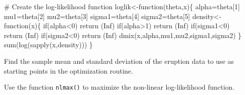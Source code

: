 \documentclass[
  letterpaper,
  DIV=11,
  numbers=noendperiod]{scrreprt}
\newenvironment{Shaded}{\begin{snugshade}}{\end{snugshade}}
\newcommand{\AttributeTok}[1]{\textcolor[rgb]{0.40,0.45,0.13}{#1}}
\newcommand{\CommentTok}[1]{\textcolor[rgb]{0.37,0.37,0.37}{#1}}
\newcommand{\ConstantTok}[1]{\textcolor[rgb]{0.56,0.35,0.01}{#1}}
\newcommand{\ControlFlowTok}[1]{\textcolor[rgb]{0.00,0.23,0.31}{#1}}
\newcommand{\DecValTok}[1]{\textcolor[rgb]{0.68,0.00,0.00}{#1}}
\newcommand{\FloatTok}[1]{\textcolor[rgb]{0.68,0.00,0.00}{#1}}
\newcommand{\FunctionTok}[1]{\textcolor[rgb]{0.28,0.35,0.67}{#1}}
\newcommand{\NormalTok}[1]{\textcolor[rgb]{0.00,0.23,0.31}{#1}}
\newcommand{\OtherTok}[1]{\textcolor[rgb]{0.00,0.23,0.31}{#1}}
\newcommand{\SpecialCharTok}[1]{\textcolor[rgb]{0.37,0.37,0.37}{#1}}
\begin{document}
\begin{Shaded}
\begin{Highlighting}[]
\CommentTok{\# Create the log{-}likelihood function}
\NormalTok{loglik}\OtherTok{\textless{}{-}}\ControlFlowTok{function}\NormalTok{(theta,x)\{}
\NormalTok{  alpha}\OtherTok{=}\NormalTok{theta[}\DecValTok{1}\NormalTok{]}
\NormalTok{  mu1}\OtherTok{=}\NormalTok{theta[}\DecValTok{2}\NormalTok{]}
\NormalTok{  mu2}\OtherTok{=}\NormalTok{theta[}\DecValTok{3}\NormalTok{]}
\NormalTok{  sigma1}\OtherTok{=}\NormalTok{theta[}\DecValTok{4}\NormalTok{]}
\NormalTok{  sigma2}\OtherTok{=}\NormalTok{theta[}\DecValTok{5}\NormalTok{]}
\NormalTok{  density}\OtherTok{\textless{}{-}}\ControlFlowTok{function}\NormalTok{(x)\{}
    \ControlFlowTok{if}\NormalTok{(alpha}\SpecialCharTok{\textless{}}\DecValTok{0}\NormalTok{) }\FunctionTok{return}\NormalTok{ (}\ConstantTok{Inf}\NormalTok{)}
    \ControlFlowTok{if}\NormalTok{(alpha}\SpecialCharTok{\textgreater{}}\DecValTok{1}\NormalTok{) }\FunctionTok{return}\NormalTok{ (}\ConstantTok{Inf}\NormalTok{)}
    \ControlFlowTok{if}\NormalTok{(sigma1}\SpecialCharTok{\textless{}}\DecValTok{0}\NormalTok{) }\FunctionTok{return}\NormalTok{ (}\ConstantTok{Inf}\NormalTok{)}
    \ControlFlowTok{if}\NormalTok{(sigma2}\SpecialCharTok{\textless{}}\DecValTok{0}\NormalTok{) }\FunctionTok{return}\NormalTok{ (}\ConstantTok{Inf}\NormalTok{)}
    \FunctionTok{dmix}\NormalTok{(x,alpha,mu1,mu2,sigma1,sigma2)}
\NormalTok{  \}}
  \FunctionTok{sum}\NormalTok{(}\FunctionTok{log}\NormalTok{(}\FunctionTok{sapply}\NormalTok{(x,density)))}
\NormalTok{\}}
\end{Highlighting}
\end{Shaded}

Find the sample mean and standard deviation of the eruption data to use
as starting points in the optimization routine.

\begin{Shaded}
\end{Shaded}

Use the function \texttt{nlmax()} to maximize the non-linear
log-likelihood function.

\begin{Shaded}
\end{Shaded}
\end{document}

